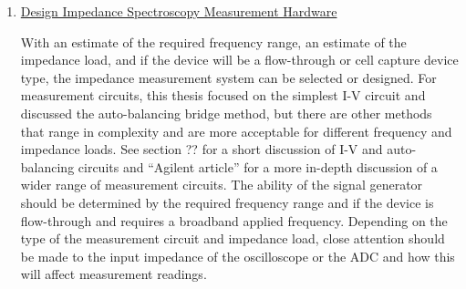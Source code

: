 \begin{enumerate}
    
    \item \underline{Design Impedance Spectroscopy Measurement Hardware}
    \par With an estimate of the required frequency range, an estimate of the impedance load, and if the device will be a flow-through or cell capture device type, the impedance measurement system can be selected or designed. For measurement circuits, this thesis focused on the simplest I-V circuit and discussed the auto-balancing bridge method, but there are other methods that range in complexity and are more acceptable for different frequency and impedance loads. See section ?? for a short discussion of I-V and auto-balancing circuits and “Agilent article” for a more in-depth discussion of a wider range of measurement circuits. The ability of the signal generator should be determined by the required frequency range and if the device is flow-through and requires a broadband applied frequency. Depending on the type of the measurement circuit and impedance load, close attention should be made to the input impedance of the oscilloscope or the ADC and how this will affect measurement readings. 
\end{enumerate}